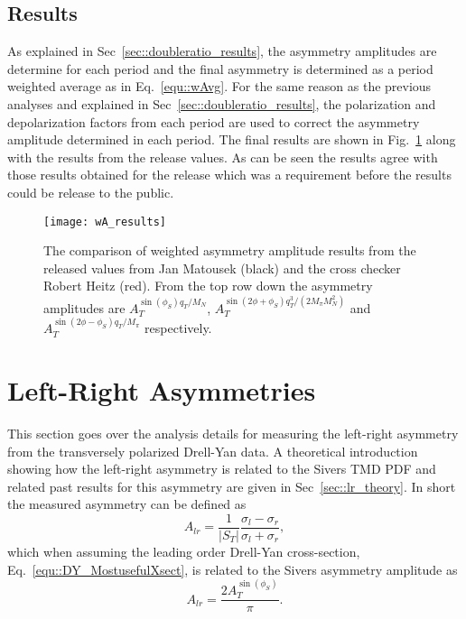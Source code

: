 \subsection{Results}
As explained in Sec~\ref{sec::doubleratio_results}, the asymmetry amplitudes are
determine for each period and the final asymmetry is determined as a period
weighted average as in Eq.~\ref{equ::wAvg}.  For the same reason as the previous
analyses and explained in Sec~\ref{sec::doubleratio_results}, the polarization
and depolarization factors from each period are used to correct the asymmetry
amplitude determined in each period.  The final results are shown in
Fig.~\ref{fig::wA_results} along with the results from the release values.  As
can be seen the results agree with those results obtained for the release which
was a requirement before the results could be release to the public.

\begin{figure}[h!t]
  \centering \texttt{[image: wA\_results]}
  \caption{The comparison of weighted asymmetry amplitude results from the
    released values from Jan Matousek (black) and the cross checker Robert Heitz
    (red).  From the top row down the asymmetry amplitudes are
    $A_T^{\sin(\phi_S) q_T/M_N}$, $A_T^{\sin(2\phi+\phi_S)
      q^3_T/(2M_{\pi}M_N^2)}$ and $A_T^{\sin(2\phi-\phi_S) q_T/M_{\pi}}$
    respectively.}
  \label{fig::wA_results}
\end{figure}


\section{Left-Right Asymmetries} \label{sec::leftrightasym}

This section goes over the analysis details for measuring the left-right
asymmetry from the transversely polarized Drell-Yan data.  A theoretical
introduction showing how the left-right asymmetry is related to the Sivers TMD
PDF and related past results for this asymmetry are given in
Sec~\ref{sec::lr_theory}.  In short the measured asymmetry can be defined as
\begin{equation}
  A_{lr} = \frac{1}{|S_T|}
  \frac{\sigma_l - \sigma_r}{\sigma_l +
    \sigma_r},
\end{equation}
\noindent
which when assuming the leading order Drell-Yan cross-section,
Eq.~\ref{equ::DY_MostusefulXsect}, is related to the Sivers asymmetry amplitude
as
\begin{equation}
  A_{lr} = \frac{2A_T^{\sin(\phi_S)}}{\pi}.
\end{equation}

